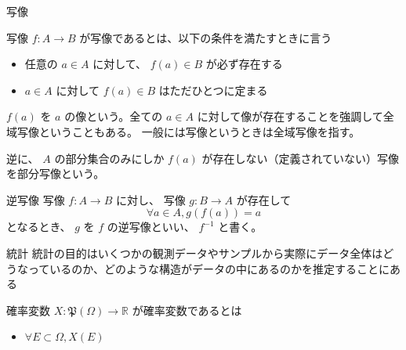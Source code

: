 \documentclass[dvipdfmx,12pt,a4paper,handout]{beamer}
\begin{document}
\begin{frame}{写像}
 \begin{block}{写像}
  $f: A \rightarrow B$ が写像であるとは、以下の条件を満たすときに言う
  \begin{itemize}
  \item 任意の $a \in A$ に対して、 $f(a) \in B$ が必ず存在する
  \item $a \in A$ に対して $f(a) \in B$ はただひとつに定まる
  \end{itemize}
 \end{block}

 $f(a)$ を $a$ の像という。全ての $a \in A$ に対して像が存在することを強調して全域写像ということもある。
 一般には写像というときは全域写像を指す。

 逆に、 $A$ の部分集合のみにしか $f(a)$ が存在しない（定義されていない）写像を部分写像という。

\begin{block}{逆写像}
 写像 $f: A \rightarrow B$ に対し、 写像 $g: B \rightarrow A$ が存在して
 \[
  \forall a \in A, g(f(a)) = a
 \]
 となるとき、 $g$ を $f$ の逆写像といい、 $f^{-1}$ と書く。
\end{block}
\end{frame}

\begin{frame}{統計}
 統計の目的はいくつかの観測データやサンプルから実際にデータ全体はどうなっているのか、どのような構造がデータの中にあるのかを推定することにある


\end{frame}

\begin{frame}{確率変数}
 $X: \mathfrak{P}(\Omega) \rightarrow \mathbb{R}$ が確率変数であるとは
 \begin{itemize}
  \item $\forall E \subset \Omega, X(E)$
 \end{itemize}
\end{frame}
\end{document}
